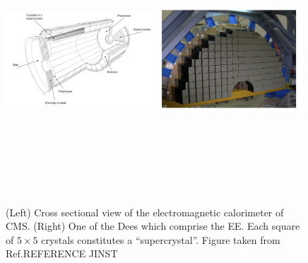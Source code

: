 \begin{figure}[!htb]
    \centering
    \captionsetup{justification=justified}
    \includegraphics[width=0.49\textwidth,height=10cm,keepaspectratio]{figures/cms/ecal/xs_whiteblack.jpeg}
    \includegraphics[width=0.49\textwidth,height=10cm,keepaspectratio]{figures/cms/ecal/dee.jpeg}
    \caption{
        (Left) Cross sectional view of the electromagnetic calorimeter of CMS.
        (Right) One of the Dees which comprise the EE.
        Each square of $ 5 \times 5$ crystals constitutes a ``supercrystal''.
        Figure taken from Ref.REFERENCE JINST%
        }
    \label{fig:ecal_xs}
\end{figure}

